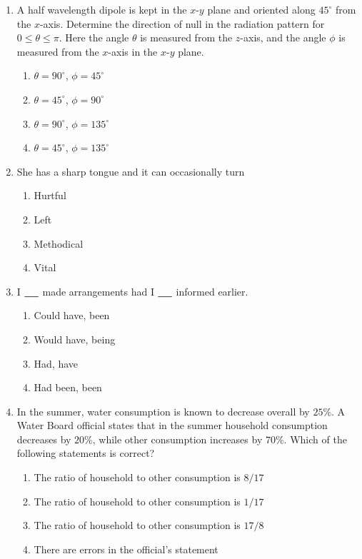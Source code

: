 \documentclass[journal,12pt,onecolumn]{IEEEtran}
\theoremstyle{remark}
\begin{document}
\begin{enumerate}
\item A half wavelength dipole is kept in the $x$-$y$ plane and oriented along $45^\circ$ from the $x$-axis. Determine the direction of null in the radiation pattern for $0 \leq \theta \leq \pi$. Here the angle $\theta$ is measured from the $z$-axis, and the angle $\phi$ is measured from the $x$-axis in the $x$-$y$ plane.
\begin{multicols}{2}
\begin{enumerate}
\item $\theta = 90^\circ$, $\phi = 45^\circ$
\item $\theta = 45^\circ$, $\phi = 90^\circ$
\item $\theta = 90^\circ$, $\phi = 135^\circ$
\item $\theta = 45^\circ$, $\phi = 135^\circ$
\end{enumerate}
\end{multicols}
\hfill {}

\item She has a sharp tongue and it can occasionally turn
\begin{multicols}{4}
\begin{enumerate}
\item Hurtful
\item Left
\item Methodical
\item Vital
\end{enumerate}
\end{multicols}
\hfill {}

\item I $\underline{\hspace{0.5cm}}$ made arrangements had I $\underline{\hspace{0.5cm}}$ informed earlier.
\begin{multicols}{2}
\begin{enumerate}
\item Could have, been
\item Would have, being
\item Had, have
\item Had been, been
\end{enumerate}
\end{multicols}
\hfill {}

\item In the summer, water consumption is known to decrease overall by $25\%$. A Water Board official states that in the summer household consumption decreases by $20\%$, while other consumption increases by $70\%$. Which of the following statements is correct?
\begin{enumerate}
\item The ratio of household to other consumption is $8/17$
\item The ratio of household to other consumption is $1/17$
\item The ratio of household to other consumption is $17/8$
\item There are errors in the official's statement
\end{enumerate}
\hfill {}


\end{enumerate}
\end{document}
